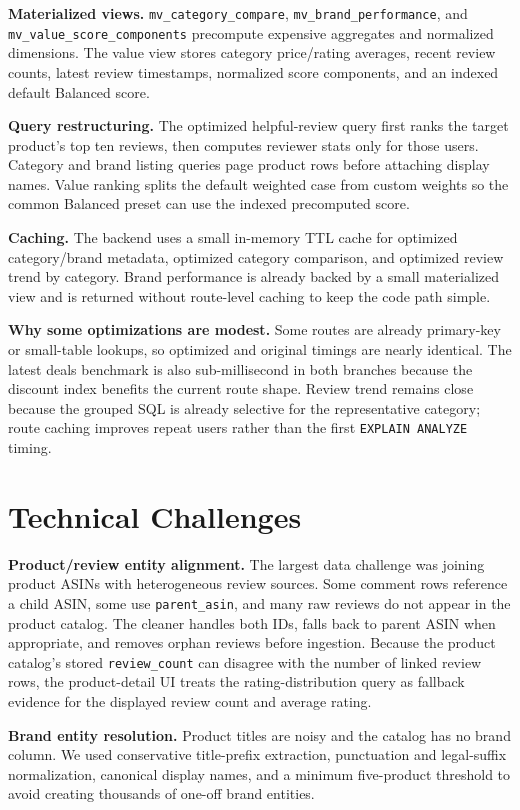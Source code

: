 \documentclass[10pt]{article}
\begin{document}
\textbf{Materialized views.} \texttt{mv\_category\_compare},
\texttt{mv\_brand\_performance}, and \texttt{mv\_value\_score\_components}
precompute expensive aggregates and normalized dimensions. The value view stores
category price/rating averages, recent review counts, latest review timestamps,
normalized score components, and an indexed default Balanced score.

\textbf{Query restructuring.} The optimized helpful-review query first ranks the
target product's top ten reviews, then computes reviewer stats only for those
users. Category and brand listing queries page product rows before attaching
display names. Value ranking splits the default weighted case from custom
weights so the common Balanced preset can use the indexed precomputed score.

\textbf{Caching.} The backend uses a small in-memory TTL cache for optimized
category/brand metadata, optimized category comparison, and optimized review
trend by category. Brand performance is already backed by a small materialized
view and is returned without route-level caching to keep the code path simple.

\textbf{Why some optimizations are modest.} Some routes are already primary-key
or small-table lookups, so optimized and original timings are nearly identical.
The latest deals benchmark is also sub-millisecond in both branches because the
discount index benefits the current route shape. Review trend remains close
because the grouped SQL is already selective for the representative category;
route caching improves repeat users rather than the first
\texttt{EXPLAIN ANALYZE} timing.

\section{Technical Challenges}
\textbf{Product/review entity alignment.} The largest data challenge was joining
product ASINs with heterogeneous review sources. Some comment rows reference a
child ASIN, some use \texttt{parent\_asin}, and many raw reviews do not appear
in the product catalog. The cleaner handles both IDs, falls back to parent ASIN
when appropriate, and removes orphan reviews before ingestion. Because the
product catalog's stored \texttt{review\_count} can disagree with the number of
linked review rows, the product-detail UI treats the rating-distribution query
as fallback evidence for the displayed review count and average rating.

\textbf{Brand entity resolution.} Product titles are noisy and the catalog has
no brand column. We used conservative title-prefix extraction, punctuation and
legal-suffix normalization, canonical display names, and a minimum five-product
threshold to avoid creating thousands of one-off brand entities.
\end{document}
